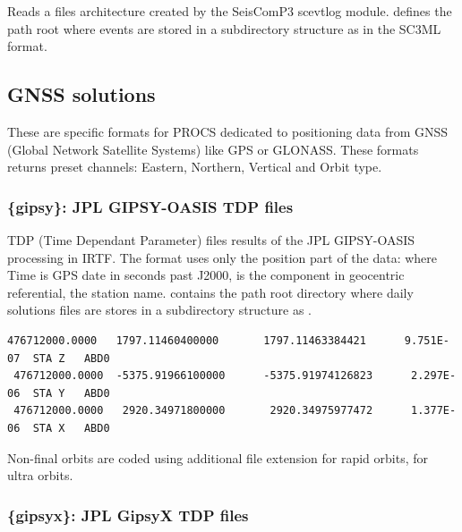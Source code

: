 Reads a files architecture created by the SeisComP3 scevtlog module.  defines the path root where events are stored in a subdirectory structure as  in the SC3ML format.


\subsection{GNSS solutions}
\label{gnssformats}
These are specific formats for PROCS dedicated to positioning data from GNSS (Global Network Satellite Systems) like GPS or GLONASS. These formats returns preset channels: Eastern, Northern, Vertical and Orbit type.

\subsubsection{\{gipsy\}: JPL GIPSY-OASIS TDP files}

TDP (Time Dependant Parameter) files results of the JPL GIPSY-OASIS processing in IRTF. The format uses only the position part of the data:  where Time is GPS date in seconds past J2000,  is the component in geocentric referential,  the station name.  contains the path root directory where daily solutions files are stores in a subdirectory structure as .

\begin{lstlisting}[language={},title=GIPSY-OASIS TDP format example]
 476712000.0000   1797.11460400000       1797.11463384421      9.751E-07  STA Z   ABD0
 476712000.0000  -5375.91966100000      -5375.91974126823      2.297E-06  STA Y   ABD0
 476712000.0000   2920.34971800000       2920.34975977472      1.377E-06  STA X   ABD0
\end{lstlisting}

Non-final orbits are coded using additional file extension  for rapid orbits,  for ultra orbits.

\subsubsection{\{gipsyx\}: JPL GipsyX TDP files}

